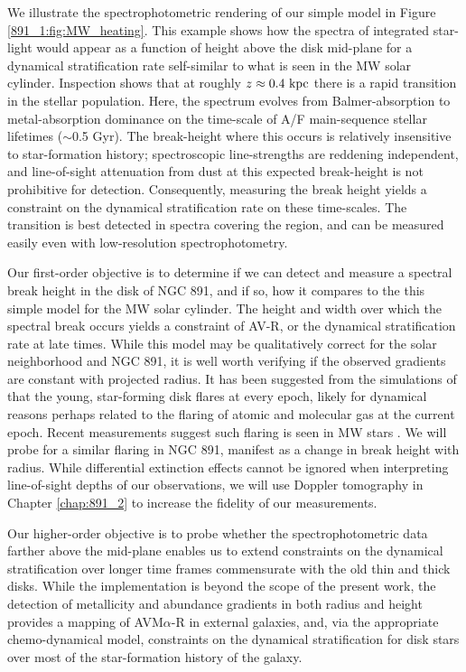 We illustrate the spectrophotometric rendering of our simple model in
Figure \ref{891_1:fig:MW_heating}.  This example shows how the spectra
of integrated star-light would appear as a function of height above
the disk mid-plane for a dynamical stratification rate self-similar to
what is seen in the MW solar cylinder. Inspection shows that at
roughly $z \approx 0.4~\mathrm{kpc} $ there is a rapid transition in the
stellar population.  Here, the spectrum evolves from Balmer-absorption
to metal-absorption dominance on the time-scale of A/F main-sequence
stellar lifetimes ($\sim$0.5 Gyr). The break-height where this occurs
is relatively insensitive to star-formation history; spectroscopic
line-strengths are reddening independent, and line-of-sight
attenuation from dust at this expected break-height is not prohibitive
for detection.  Consequently, measuring the break height yields a
constraint on the dynamical stratification rate on these
time-scales. The transition is best detected in spectra covering the
 region, and can be measured easily even with
low-resolution spectrophotometry.

Our first-order objective is to determine if we can detect and measure
a spectral break height in the disk of NGC 891, and if so, how it
compares to the this simple model for the MW solar cylinder. The
height and width over which the spectral break occurs yields a
constraint of AV-R, or the dynamical stratification rate at late
times. While this model may be qualitatively correct for the solar
neighborhood and NGC 891, it is well worth verifying if the observed
gradients are constant with projected radius.  It has been suggested
from the simulations of \citet{Martig14a} that the young, star-forming
disk flares at every epoch, likely for dynamical reasons perhaps
related to the flaring of atomic and molecular gas at the current
epoch. Recent measurements suggest such flaring is seen in MW stars
\citep{Ness16}. We will probe for a similar flaring in NGC 891,
manifest as a change in break height with radius.  While differential
extinction effects cannot be ignored when interpreting line-of-sight
depths of our observations, we will use Doppler tomography in Chapter
\ref{chap:891_2} \citep[see for example,][]{Kregel05} to increase the
fidelity of our measurements.

Our higher-order objective is to probe whether the spectrophotometric
data farther above the mid-plane enables us to extend constraints on
the dynamical stratification over longer time frames commensurate with
the old thin and thick disks.  While the implementation is beyond the
scope of the present work, the detection of metallicity and abundance
gradients in both radius and height provides a mapping of
AVM$\alpha$-R in external galaxies, and, via the appropriate
chemo-dynamical model, constraints on the dynamical stratification for
disk stars over most of the star-formation history of the galaxy.


